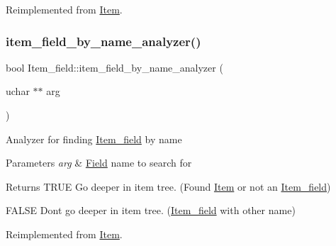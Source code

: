 Reimplemented from \mbox{\hyperlink{classItem_aa04fbf99d5b417b78536362654daff73}{Item}}.

\mbox{\label{classItem__field_aee675801bd0ba08e66d0210a597390de}} 
\subsubsection{\texorpdfstring{item\+\_\+field\+\_\+by\+\_\+name\+\_\+analyzer()}{item\_field\_by\_name\_analyzer()}}
{\footnotesize\ttfamily bool Item\+\_\+field\+::item\+\_\+field\+\_\+by\+\_\+name\+\_\+analyzer (\begin{DoxyParamCaption}\item[{uchar $\ast$$\ast$}]{arg }\end{DoxyParamCaption})\hspace{0.3cm}{\ttfamily [virtual]}}

Analyzer for finding \mbox{\hyperlink{classItem__field}{Item\+\_\+field}} by name


\begin{DoxyParams}{Parameters}
{\em arg} & \mbox{\hyperlink{classField}{Field}} name to search for\\
\hline
\end{DoxyParams}
\begin{DoxyReturn}{Returns}
T\+R\+UE Go deeper in item tree. (Found \mbox{\hyperlink{classItem}{Item}} or not an \mbox{\hyperlink{classItem__field}{Item\+\_\+field}}) 

F\+A\+L\+SE Don\textquotesingle{}t go deeper in item tree. (\mbox{\hyperlink{classItem__field}{Item\+\_\+field}} with other name) 
\end{DoxyReturn}


Reimplemented from \mbox{\hyperlink{classItem_a7d19cd31c89cf5e660667dc27873a265}{Item}}.

\mbox{\label{classItem__field_a6f22b76914e17709e6f3d8e894d8807d}} 
